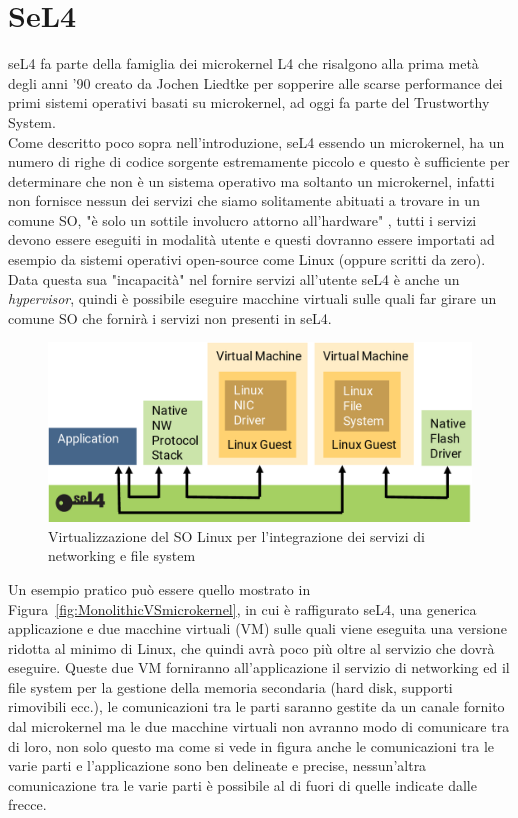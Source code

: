 \chapter{SeL4}
seL4 fa parte della famiglia dei microkernel L4 che risalgono alla prima metà degli anni '90 creato da Jochen Liedtke per sopperire alle scarse performance dei primi sistemi operativi basati su microkernel, ad oggi fa parte del Trustworthy System.\\
Come descritto poco sopra nell'introduzione, seL4 essendo un microkernel, ha un numero di righe di codice sorgente estremamente piccolo e questo è sufficiente per determinare che non è un sistema operativo ma soltanto un microkernel, infatti non fornisce nessun dei servizi che siamo solitamente abituati a trovare in un comune SO, "è solo un sottile involucro attorno all'hardware" \cite{sel4-whitepaper}, tutti i servizi devono essere eseguiti in modalità utente e questi dovranno essere importati ad esempio da sistemi operativi open-source come Linux (oppure scritti da zero). Data questa sua "incapacità" nel fornire servizi all'utente seL4 è anche un \textit{hypervisor}, quindi è possibile eseguire macchine virtuali sulle quali far girare un comune SO che fornirà i servizi non presenti in seL4.
\begin{figure}[h]
  \includegraphics[width=\linewidth]{img/seL4Hypervisor.png}
  \caption{Virtualizzazione del SO Linux per l'integrazione dei servizi di networking e file system}
  \label{fig:Virtualizzazione}
\end{figure}

Un esempio pratico può essere quello mostrato in Figura~\ref{fig:MonolithicVSmicrokernel}, in cui è raffigurato seL4, una generica applicazione e due macchine virtuali (VM) sulle quali viene eseguita una versione ridotta al minimo di Linux, che quindi avrà poco più oltre al servizio che dovrà eseguire.
Queste due VM forniranno all'applicazione il servizio di networking ed il file system per la gestione della memoria secondaria (hard disk, supporti rimovibili ecc.), le comunicazioni tra le parti saranno gestite da un canale fornito dal microkernel ma le due macchine virtuali non avranno modo di comunicare tra di loro, non solo questo ma come si vede in figura anche le comunicazioni tra le varie parti e l'applicazione sono ben delineate e precise, nessun'altra comunicazione tra le varie parti è possibile al di fuori di quelle indicate dalle frecce.

